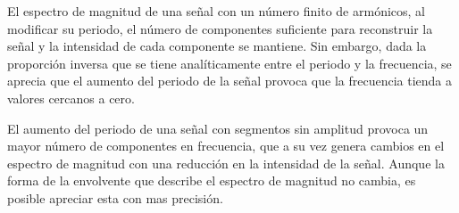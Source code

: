 \documentclass[11pt]{article}
\begin{document}
\begin{multicols}{2}
    El espectro de magnitud de una señal con un número finito de armónicos, al modificar su periodo, 
    el número de componentes suficiente para reconstruir la señal y la intensidad de cada componente 
    se mantiene. Sin embargo, dada la proporción inversa que se tiene analíticamente entre el periodo
    y la frecuencia, se aprecia que el aumento del periodo de la señal provoca que la frecuencia 
    tienda a valores cercanos a cero.

    El aumento del periodo de una señal con segmentos sin amplitud provoca un mayor número de componentes 
    en frecuencia, que a su vez genera cambios en el espectro de magnitud con una reducción en la intensidad 
    de la señal. Aunque la forma de la envolvente que describe el espectro de magnitud no
    cambia, es posible apreciar esta con mas precisión. 


\end{multicols}
\end{document}
